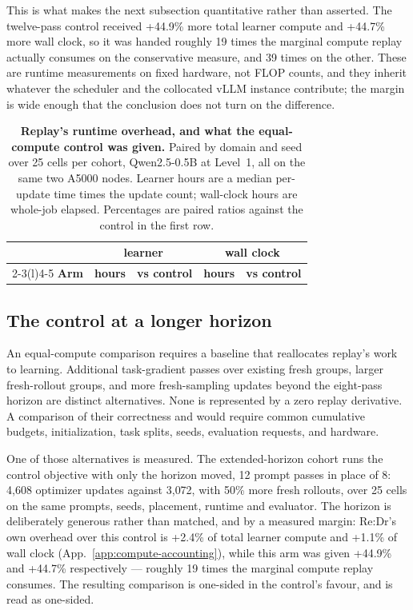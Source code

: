 This is what makes the next subsection quantitative rather than asserted. The
twelve-pass control received +44.9\% more total learner compute and
+44.7\% more wall clock, so it was handed roughly
19 times the marginal compute replay actually consumes on
the conservative measure, and 39 times on the other. These are
runtime measurements on fixed hardware, not FLOP counts, and they inherit
whatever the scheduler and the collocated vLLM instance contribute; the margin
is wide enough that the conclusion does not turn on the difference.

\begin{table}[!htbp]
  \centering
  \caption{\textbf{Replay's runtime overhead, and what the equal-compute
  control was given.} Paired by domain and seed over 25 cells per
  cohort, Qwen2.5-0.5B at Level~1, all on the same two A5000 nodes.
  Learner hours are a median per-update time times the update count; wall-clock
  hours are whole-job elapsed. Percentages are paired ratios against the
  control in the first row.}
  \label{tab:replay-runtime}
  \small
  \setlength{\tabcolsep}{6pt}
  \begin{tabular}{@{}lrrrr@{}}
    \toprule
    & \multicolumn{2}{c}{\textbf{learner}} & \multicolumn{2}{c}{\textbf{wall clock}} \\
    \cmidrule(lr){2-3}\cmidrule(l){4-5}
    \textbf{Arm} & \textbf{hours} & \textbf{vs control}
      & \textbf{hours} & \textbf{vs control} \\
    \midrule
    
  \end{tabular}
\end{table}

\subsection{The control at a longer horizon}
\label{app:compute-budget-control}

An equal-compute comparison requires a baseline that reallocates replay's
work to learning. Additional task-gradient passes over existing fresh groups,
larger fresh-rollout groups, and more fresh-sampling updates beyond the
eight-pass horizon are distinct alternatives. None is represented by a
zero replay derivative. A comparison of their correctness and \pmd{} would
require common cumulative budgets, initialization, task splits, seeds,
evaluation requests, and hardware.

One of those alternatives is measured. The extended-horizon cohort runs the
control objective with only the horizon moved, 12 prompt passes in
place of 8: 4{,}608 optimizer updates against
3{,}072, with 50\% more fresh rollouts, over 25 cells on the
same prompts, seeds, placement, runtime and evaluator. The horizon is
deliberately generous rather than matched, and by a measured margin: Re:Dr's
own overhead over this control is +2.4\% of total learner
compute and +1.1\% of wall clock
(App.~\ref{app:compute-accounting}), while this arm was given
+44.9\% and +44.7\% respectively --- roughly
19 times the marginal compute replay consumes. The resulting
comparison is one-sided in the control's favour, and is read as one-sided.


